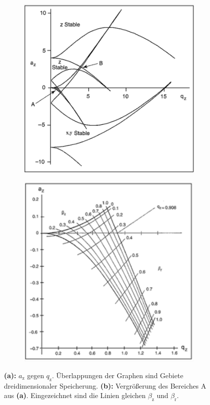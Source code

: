 \documentclass[numbers=noenddot,a4paper,notitlepage,twoside,BCOR15mm]{scrartcl}
\newcommand{\ix}[1]{_\text{#1}}
\newcommand{\fett}[1]{\textbf{#1}}
\begin{document}
		\begin{figure}[t]
			\centering
			\begin{subfigure}[t]{0.4\textwidth}
				\includegraphics[width=\textwidth]{pics/stab_1.png}
				\caption{}\label{img:stab1}
			\end{subfigure}
			\vspace{0.2cm}
			\begin{subfigure}[t]{0.37\textwidth}
				\includegraphics[width=\textwidth]{pics/stab_2.png}
				\caption{}\label{img:stab2}
			\end{subfigure}
			\caption{\fett{(a):} $a\ix{z}$ gegen $q\ix{z}$. Überlappungen der Graphen sind Gebiete dreidimensionaler Speicherung. \fett{(b):} Vergrößerung des Bereiches A aus \fett{(a)}. Eingezeichnet sind die Linien gleichen $\beta\ix{z}$ und $\beta\ix{r}$. }\label{img:stab}
		\end{figure}
\end{document}
